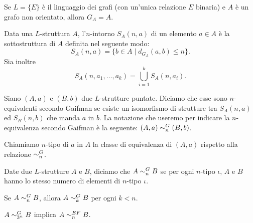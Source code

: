 \begin{osservazione}
  Se $L=\{E\}$ è il linguaggio dei grafi (con un'unica relazione $E$ binaria) e $A$ è un grafo non orientato, allora $G_A=A$.
\end{osservazione}

\begin{definizione}
  Data una $L$-struttura $A$, l'$n$-intorno $S_A(n,a)$ di un elemento $a\in A$ è la sottostruttura di $A$ definita nel seguente modo:
  \[ S_A(n,a) = \{ b\in A \mid d_{G_A}(a,b) \leq n \}. \]
  Sia inoltre
  \[ S_A(n,a_1,\ldots,a_k) = \bigcup_{i=1}^k S_A(n,a_i). \]
\end{definizione}

\begin{definizione}
  Siano $(A,a)$ e $(B,b)$ due $L$-strutture puntate. Diciamo che esse sono $n$-equivalenti secondo Gaifman se esiste un isomorfismo di strutture tra $S_A(n,a)$ ed $S_B(n,b)$ che manda $a$ in $b$.
  La notazione che useremo per indicare la $n$-equivalenza secondo Gaifman è la seguente: $(A,a) \sim^{G}_{n} (B,b)$.
\end{definizione}

\begin{definizione}
  Chiamiamo $n$-tipo di $a$ in $A$ la classe di equivalenza di $(A,a)$ rispetto alla relazione $\sim^{G}_{n}$.
\end{definizione}

\begin{definizione}
  Date due $L$-strutture $A$ e $B$, diciamo che $A\sim^{G}_{n} B$ se per ogni $n$-tipo $\iota$, $A$ e $B$ hanno lo stesso numero di elementi di $n$-tipo $\iota$.
\end{definizione}

\begin{osservazione}
  Se $A\sim^{G}_{n} B$, allora $A\sim^{G}_{k} B$ per ogni $k<n$.
\end{osservazione}


\begin{teorema}
  \label{thm:gaifman}
  $A \sim^{G}_{3^n} B$ implica $A \sim^{EF}_n B$.
\end{teorema}

